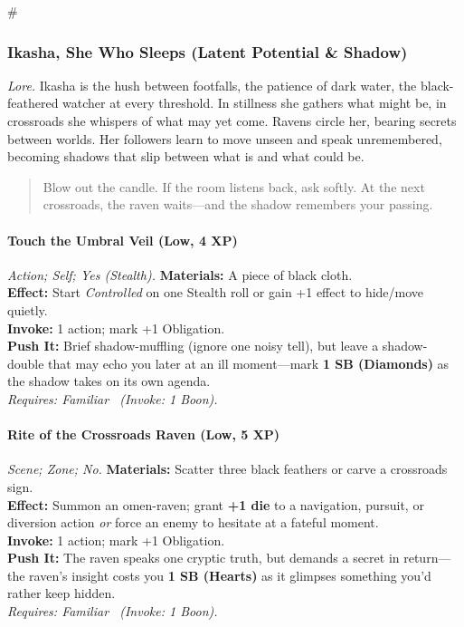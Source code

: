 # %

\subsubsection{Ikasha, She Who Sleeps (Latent Potential \& Shadow)}
\textit{Lore.} Ikasha is the hush between footfalls, the patience of dark water, the black-feathered watcher at every threshold. In stillness she gathers what might be, in crossroads she whispers of what may yet come. Ravens circle her, bearing secrets between worlds. Her followers learn to move unseen and speak unremembered, becoming shadows that slip between what is and what could be.

\begin{quote}
Blow out the candle. If the room listens back, ask softly. At the next crossroads, the raven waits—and the shadow remembers your passing.
\end{quote}

\paragraph*{Touch the Umbral Veil (Low, 4 XP)} \emph{Action; Self; Yes (Stealth).}
\textbf{Materials:} A piece of black cloth.\\
\textbf{Effect:} Start \emph{Controlled} on one Stealth roll or gain +1 effect to hide/move quietly.\\
\textbf{Invoke:} 1 action; mark +1 Obligation.\\
\textbf{Push It:} Brief shadow-muffling (ignore one noisy tell), but leave a shadow-double that may echo you later at an ill moment—mark \textbf{1 SB (Diamonds)} as the shadow takes on its own agenda.\\
\emph{Requires: Familiar \ (\textit{Invoke:} 1 Boon).}

\paragraph*{Rite of the Crossroads Raven (Low, 5 XP)} \emph{Scene; Zone; No.}
\textbf{Materials:} Scatter three black feathers or carve a crossroads sign.\\
\textbf{Effect:} Summon an omen-raven; grant \textbf{+1 die} to a navigation, pursuit, or diversion action \emph{or} force an enemy to hesitate at a fateful moment.\\
\textbf{Invoke:} 1 action; mark +1 Obligation.\\
\textbf{Push It:} The raven speaks one cryptic truth, but demands a secret in return—the raven's insight costs you \textbf{1 SB (Hearts)} as it glimpses something you'd rather keep hidden.\\
\emph{Requires: Familiar \ (\textit{Invoke:} 1 Boon).}

